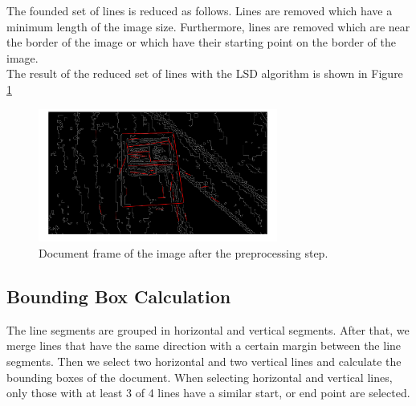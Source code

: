 \documentclass[english, paper=a4]{scrartcl}
\begin{document}
The founded set of lines is reduced as follows. Lines are removed which have a minimum length of the image size. Furthermore, lines are removed which are near the border of the image or which have their starting point on the border of the image.\\
The result of the reduced set of lines with the LSD algorithm is shown in Figure \ref{fig:redLines}
\begin{figure}[h]
\centering
\includegraphics[width=0.7\textwidth]{redLines.png}
\caption{Document frame of the image after the preprocessing step.}
\label{fig:redLines}
\end{figure}

\subsection{Bounding Box Calculation}
The line segments are grouped in horizontal and vertical segments. After that, we merge lines that have the same direction with a certain margin between the line segments.
Then we select two horizontal and two vertical lines and calculate the bounding boxes of the document.
When selecting horizontal and vertical lines, only those with at least 3 of 4 lines have a similar start, or end point are selected.
\end{document}
